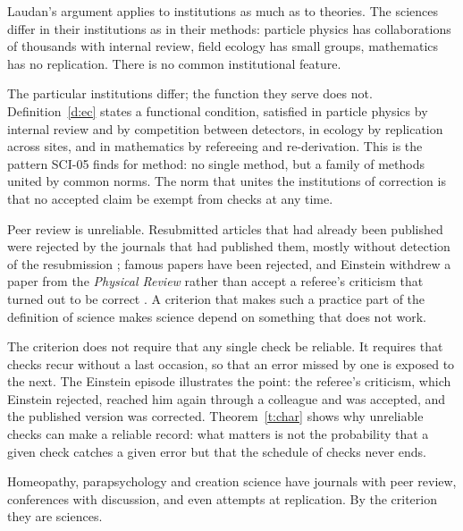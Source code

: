\documentclass{situationist-preprint}
\begin{document}
\begin{objection}[Heterogeneity]
Laudan's argument applies to institutions as much as to theories. The sciences differ in their institutions as in their methods: particle physics has collaborations of thousands with internal review, field ecology has small groups, mathematics has no replication. There is no common institutional feature.
\end{objection}

\begin{reply}
The particular institutions differ; the function they serve does not. Definition~\ref{d:ec} states a functional condition, satisfied in particle physics by internal review and by competition between detectors, in ecology by replication across sites, and in mathematics by refereeing and re-derivation. This is the pattern SCI-05 finds for method: no single method, but a family of methods united by common norms. The norm that unites the institutions of correction is that no accepted claim be exempt from checks at any time.
\end{reply}

\begin{objection}
Peer review is unreliable. Resubmitted articles that had already been published were rejected by the journals that had published them, mostly without detection of the resubmission \citep{PetersCeci1982}; famous papers have been rejected, and Einstein withdrew a paper from the \emph{Physical Review} rather than accept a referee's criticism that turned out to be correct \citep{Kennefick2005}. A criterion that makes such a practice part of the definition of science makes science depend on something that does not work.
\end{objection}

\begin{reply}
The criterion does not require that any single check be reliable. It requires that checks recur without a last occasion, so that an error missed by one is exposed to the next. The Einstein episode illustrates the point: the referee's criticism, which Einstein rejected, reached him again through a colleague and was accepted, and the published version was corrected. Theorem~\ref{t:char} shows why unreliable checks can make a reliable record: what matters is not the probability that a given check catches a given error but that the schedule of checks never ends.
\end{reply}

\begin{objection}
Homeopathy, parapsychology and creation science have journals with peer review, conferences with discussion, and even attempts at replication. By the criterion they are sciences.
\end{objection}
\end{document}
